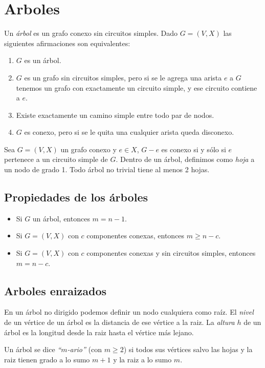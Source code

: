 \newpage
\section{Arboles}

Un \emph{\'arbol} es un grafo conexo sin circuitos simples. Dado $G=(V,X)$ las siguientes afirmaciones son equivalentes:

\begin{enumerate}
\item $G$ es un \'arbol.
\item $G$ es un grafo sin circuitos simples, pero si se le agrega una arista $e$ a $G$ tenemos un grafo con exactamente un circuito simple, y ese circuito contiene a $e$.
\item Existe exactamente un camino simple entre todo par de nodos.
\item $G$ es conexo, pero si se le quita una cualquier arista queda disconexo.
\end{enumerate}

Sea $G=(V,X)$ un grafo conexo y $e \in X$, $G-e$ es conexo si y s\'olo si $e$ pertenece a un circuito simple de $G$. Dentro de un \'arbol, definimos como \emph{hoja} a un nodo de grado 1. Todo \'arbol no trivial tiene al menos 2 hojas.

\subsection{Propiedades de los \'arboles}

\begin{itemize}
\item Si $G$ un \'arbol, entonces $m=n-1$.
\item Si $G = (V,X)$ con $c$ componentes conexas, entonces $m \geq n-c$.
\item Si $G = (V,X)$ con $c$ componentes conexas y sin circuitos simples, entonces $m=n-c$.
\end{itemize}

\subsection{Arboles enraizados}

En un \'arbol no dirigido podemos definir un nodo cualquiera como ra\'iz. El \emph{nivel} de un v\'ertice de un \'arbol es la distancia de ese v\'ertice a la raiz. La \emph{altura} $h$ de un \'arbol es la longitud desde la raiz hasta el v\'ertice m\'as lejano. 

Un \'arbol se dice \emph{``$m$-ario''} (con $m \geq 2$) si todos sus v\'ertices salvo las hojas y la raiz tienen grado a lo sumo $m+1$ y la raiz a lo sumo $m$.


